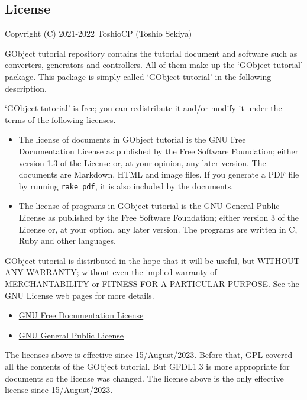 \subsection{License}\label{license}

Copyright (C) 2021-2022 ToshioCP (Toshio Sekiya)

GObject tutorial repository contains the tutorial document and software
such as converters, generators and controllers. All of them make up the
`GObject tutorial' package. This package is simply called `GObject
tutorial' in the following description.

`GObject tutorial' is free; you can redistribute it and/or modify it
under the terms of the following licenses.

\begin{itemize}
\tightlist
\item
  The license of documents in GObject tutorial is the GNU Free
  Documentation License as published by the Free Software Foundation;
  either version 1.3 of the License or, at your opinion, any later
  version. The documents are Markdown, HTML and image files. If you
  generate a PDF file by running \passthrough{\lstinline!rake pdf!}, it
  is also included by the documents.
\item
  The license of programs in GObject tutorial is the GNU General Public
  License as published by the Free Software Foundation; either version 3
  of the License or, at your option, any later version. The programs are
  written in C, Ruby and other languages.
\end{itemize}

GObject tutorial is distributed in the hope that it will be useful, but
WITHOUT ANY WARRANTY; without even the implied warranty of
MERCHANTABILITY or FITNESS FOR A PARTICULAR PURPOSE. See the GNU License
web pages for more details.

\begin{itemize}
\tightlist
\item
  \href{https://www.gnu.org/licenses/fdl-1.3.html}{GNU Free
  Documentation License}
\item
  \href{https://www.gnu.org/licenses/gpl-3.0.html}{GNU General Public
  License}
\end{itemize}

The licenses above is effective since 15/August/2023. Before that, GPL
covered all the contents of the GObject tutorial. But GFDL1.3 is more
appropriate for documents so the license was changed. The license above
is the only effective license since 15/August/2023.
